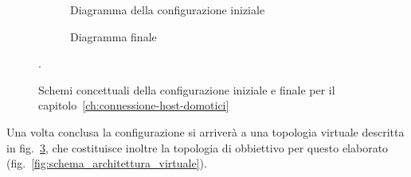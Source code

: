 \begin{figure}[H]
    \centering
    \begin{subfigure}{0.44\linewidth}
        \centering
        \usebox{\myimage}
        \caption{Diagramma della configurazione iniziale}
        \label{fig:diag2-host_real}
    \end{subfigure}
    \hfill
    \begin{subfigure}{0.53\linewidth}
        \centering
        \caption{Diagramma finale}
        \label{fig:diag2-host_virtual}
    \end{subfigure}
    \caption{Schemi concettuali della configurazione iniziale e finale per il capitolo~\ref{ch:connessione-host-domotici}}.
\end{figure}

Una volta conclusa la configurazione si arriverà a una topologia virtuale descritta in fig.~\ref{fig:diag2-host_virtual}, che costituisce inoltre la topologia di obbiettivo per questo elaborato (fig.~\ref{fig:schema_architettura_virtuale}).

